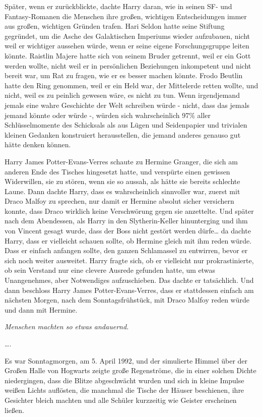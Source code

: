 {Später, wenn er zurückblickte, dachte Harry daran, wie in seinen SF- und Fantasy-Romanen die Menschen ihre großen, wichtigen Entscheidungen immer aus großen, wichtigen Gründen trafen. Hari Seldon hatte seine Stiftung gegründet, um die Asche des Galaktischen Imperiums wieder aufzubauen, nicht weil er wichtiger aussehen würde, wenn er seine eigene Forschungsgruppe leiten könnte. Raistlin Majere hatte sich von seinem Bruder getrennt, weil er ein Gott werden wollte, nicht weil er in persönlichen Beziehungen inkompetent und nicht bereit war, um Rat zu fragen, wie er es besser machen könnte. Frodo Beutlin hatte den Ring genommen, weil er ein Held war, der Mittelerde retten wollte, und nicht, weil es zu peinlich gewesen wäre, es nicht zu tun. Wenn irgendjemand jemals eine wahre Geschichte der Welt schreiben würde - nicht, dass das jemals jemand könnte oder würde -, würden sich wahrscheinlich 97\% aller Schlüsselmomente des Schicksals als aus Lügen und Seidenpapier und trivialen kleinen Gedanken konstruiert herausstellen, die jemand anderes genauso gut hätte denken können.

Harry James Potter-Evans-Verres schaute zu Hermine Granger, die sich am anderen Ende des Tisches hingesetzt hatte, und verspürte einen gewissen Widerwillen, sie zu stören, wenn sie so aussah, als hätte sie bereits schlechte Laune. Dann dachte Harry, dass es wahrscheinlich sinnvoller war, zuerst mit Draco Malfoy zu sprechen, nur damit er Hermine absolut sicher versichern konnte, dass Draco wirklich keine Verschwörung gegen sie anzettelte. Und später nach dem Abendessen, als Harry in den Slytherin-Keller hinunterging und ihm von Vincent gesagt wurde, dass der Boss nicht gestört werden dürfe… da dachte Harry, dass er vielleicht schauen sollte, ob Hermine gleich mit ihm reden würde. Dass er einfach anfangen sollte, den ganzen Schlamassel zu entwirren, bevor er sich noch weiter ausweitet. Harry fragte sich, ob er vielleicht nur prokrastinierte, ob sein Verstand nur eine clevere Ausrede gefunden hatte, um etwas Unangenehmes, aber Notwendiges aufzuschieben. Das dachte er tatsächlich. Und dann beschloss Harry James Potter-Evans-Verres, dass er stattdessen einfach am nächsten Morgen, nach dem Sonntagsfrühstück, mit Draco Malfoy reden würde und dann mit Hermine.

\emph{Menschen machten so etwas andauernd.}

….

Es war Sonntagmorgen, am 5. April 1992, und der simulierte Himmel über der Großen Halle von Hogwarts zeigte große Regenströme, die in einer solchen Dichte niedergingen, dass die Blitze abgeschwächt wurden und sich in kleine Impulse weißen Lichts auflösten, die manchmal die Tische der Häuser beschienen, ihre Gesichter bleich machten und alle Schüler kurzzeitig wie Geister erscheinen ließen.

}
